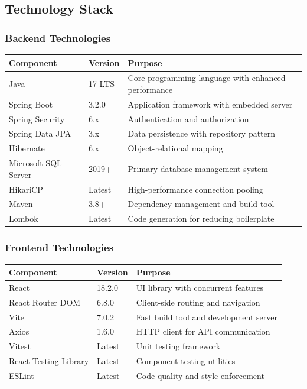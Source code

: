 \documentclass[12pt,a4paper]{article}
\begin{document}
\subsection{Technology Stack}

\subsubsection{Backend Technologies}
\begin{longtable}{|p{3cm}|p{2cm}|p{7cm}|}
\hline
\textbf{Component} & \textbf{Version} & \textbf{Purpose} \\
\hline
Java & 17 LTS & Core programming language with enhanced performance \\
\hline
Spring Boot & 3.2.0 & Application framework with embedded server \\
\hline
Spring Security & 6.x & Authentication and authorization \\
\hline
Spring Data JPA & 3.x & Data persistence with repository pattern \\
\hline
Hibernate & 6.x & Object-relational mapping \\
\hline
Microsoft SQL Server & 2019+ & Primary database management system \\
\hline
HikariCP & Latest & High-performance connection pooling \\
\hline
Maven & 3.8+ & Dependency management and build tool \\
\hline
Lombok & Latest & Code generation for reducing boilerplate \\
\hline
\end{longtable}

\subsubsection{Frontend Technologies}
\begin{longtable}{|p{3cm}|p{2cm}|p{7cm}|}
\hline
\textbf{Component} & \textbf{Version} & \textbf{Purpose} \\
\hline
React & 18.2.0 & UI library with concurrent features \\
\hline
React Router DOM & 6.8.0 & Client-side routing and navigation \\
\hline
Vite & 7.0.2 & Fast build tool and development server \\
\hline
Axios & 1.6.0 & HTTP client for API communication \\
\hline
Vitest & Latest & Unit testing framework \\
\hline
React Testing Library & Latest & Component testing utilities \\
\hline
ESLint & Latest & Code quality and style enforcement \\
\hline
\end{longtable}
\end{document}
